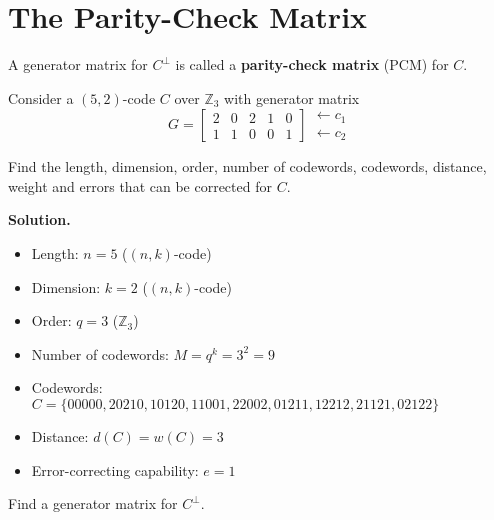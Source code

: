 \section{The Parity-Check Matrix}

\begin{defbox}
    \begin{definition}
        A generator matrix for $ C^{\perp} $ is called a \textbf{parity-check matrix}
        (PCM) for $ C $.
    \end{definition} \end{defbox}

\begin{exbox}
    \begin{example}
        Consider a $ (5,2) $-code $ C $ over $ \mathbb{Z}_3 $ with generator matrix
        \[ G=
            \begin{bmatrix}
                2 & 0 & 2 & 1 & 0 \\
                1 & 1 & 0 & 0 & 1
            \end{bmatrix}
            \begin{matrix}
                \leftarrow c_1 \\
                \leftarrow c_2
            \end{matrix} \]

        Find the length, dimension, order, number of codewords, codewords,
        distance, weight and errors that can be corrected for $ C $.

        \textbf{Solution.}
        \begin{itemize}
            \item Length: $ n=5 $ ($ (n,k) $-code)
            \item Dimension: $ k=2 $ ($ (n,k) $-code)
            \item Order: $ q=3 $ ($ \mathbb{Z}_3 $)
            \item Number of codewords: $ M=q^k=3^2=9 $
            \item Codewords: $ C=\{00000,20210,10120,11001,22002,01211,12212,21121,02122\} $
            \item Distance: $ d(C)=w(C)=3 $
            \item Error-correcting capability: $ e=1 $
        \end{itemize}

        Find a generator matrix for $ C^{\perp} $.


\end{example}
\end{exbox}
